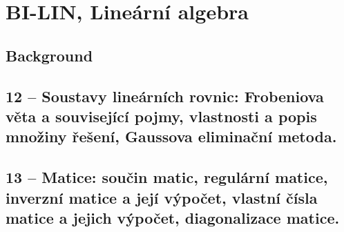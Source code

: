 \chapter{BI-LIN, Lineární algebra}

\section{Background}

\section{12 -- Soustavy lineárních rovnic: Frobeniova věta a související pojmy, vlastnosti a popis množiny řešení, Gaussova eliminační metoda.}

\section{13 -- Matice: součin matic, regulární matice, inverzní matice a její výpočet, vlastní čísla matice a jejich výpočet, diagonalizace matice.}
